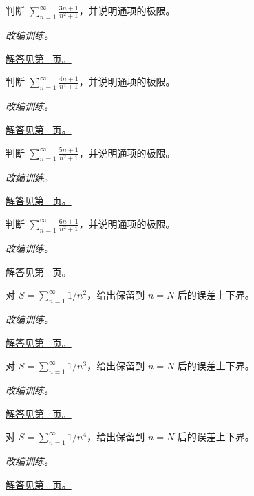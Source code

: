 \documentclass[UTF8,12pt,a4paper,fontset=fandol]{ctexart}
\begin{document}
\begin{example}[通项趋零与调和型发散]\label{ex:c25q15}
判断 $\displaystyle\sum_{n=1}^\infty\frac{3n+1}{n^2+1}$，并说明通项的极限。
\par\textit{改编训练。}\par\hyperref[ans:c25q15]{解答见第~\pageref{ans:c25q15} 页。}
\end{example}
\begin{example}[通项趋零与调和型发散]\label{ex:c25q16}
判断 $\displaystyle\sum_{n=1}^\infty\frac{4n+1}{n^2+1}$，并说明通项的极限。
\par\textit{改编训练。}\par\hyperref[ans:c25q16]{解答见第~\pageref{ans:c25q16} 页。}
\end{example}
\begin{example}[通项趋零与调和型发散]\label{ex:c25q17}
判断 $\displaystyle\sum_{n=1}^\infty\frac{5n+1}{n^2+1}$，并说明通项的极限。
\par\textit{改编训练。}\par\hyperref[ans:c25q17]{解答见第~\pageref{ans:c25q17} 页。}
\end{example}
\begin{example}[通项趋零与调和型发散]\label{ex:c25q18}
判断 $\displaystyle\sum_{n=1}^\infty\frac{6n+1}{n^2+1}$，并说明通项的极限。
\par\textit{改编训练。}\par\hyperref[ans:c25q18]{解答见第~\pageref{ans:c25q18} 页。}
\end{example}
\begin{example}[正项级数的尾和积分界]\label{ex:c25q19}
对 $S=\sum_{n=1}^\infty1/n^{2}$，给出保留到 $n=N$ 后的误差上下界。
\par\textit{改编训练。}\par\hyperref[ans:c25q19]{解答见第~\pageref{ans:c25q19} 页。}
\end{example}
\begin{example}[正项级数的尾和积分界]\label{ex:c25q20}
对 $S=\sum_{n=1}^\infty1/n^{3}$，给出保留到 $n=N$ 后的误差上下界。
\par\textit{改编训练。}\par\hyperref[ans:c25q20]{解答见第~\pageref{ans:c25q20} 页。}
\end{example}
\begin{example}[正项级数的尾和积分界]\label{ex:c25q21}
对 $S=\sum_{n=1}^\infty1/n^{4}$，给出保留到 $n=N$ 后的误差上下界。
\par\textit{改编训练。}\par\hyperref[ans:c25q21]{解答见第~\pageref{ans:c25q21} 页。}
\end{example}
\end{document}

